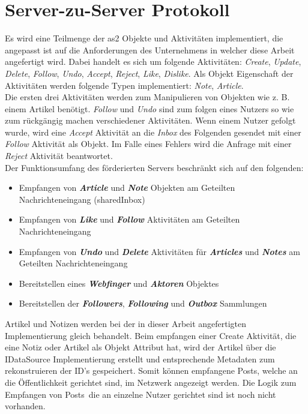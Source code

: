 \section{Server-zu-Server Protokoll}
\label{sec:server-zu-server-prot}
Es wird eine Teilmenge der \gls{as2} Objekte und Aktivitäten implementiert, die angepasst ist auf die Anforderungen des Unternehmens in welcher diese Arbeit angefertigt wird. Dabei handelt es sich um folgende Aktivitäten: \textit{Create}, \textit{Update}, \textit{Delete}, \textit{Follow}, \textit{Undo}, \textit{Accept}, \textit{Reject}, \textit{Like}, \textit{Dislike}. Als Objekt Eigenschaft der Aktivitäten werden folgende Typen implementiert: \textit{Note}, \textit{Article}.\\

Die ersten drei Aktivitäten werden zum Manipulieren von Objekten wie z. B. einem Artikel benötigt. \textit{Follow} und \textit{Undo} sind zum folgen eines Nutzers so wie zum rückgängig machen verschiedener Aktivitäten. Wenn einem Nutzer gefolgt wurde, wird eine \textit{Accept} Aktivität an die \textit{Inbox} des Folgenden gesendet mit einer \textit{Follow} Aktivität als Objekt. Im Falle eines Fehlers wird die Anfrage mit einer \textit{Reject} Aktivität beantwortet.\\

Der Funktionsumfang des förderierten Servers beschränkt sich auf den folgenden:
\begin{itemize}
	\item Empfangen von \textit{\textbf{Article}} und \textit{\textbf{Note}} Objekten am Geteilten Nachrichteneingang (sharedInbox)
	\item Empfangen von \textit{\textbf{Like}} und \textit{\textbf{Follow}} Aktivitäten am Geteilten Nachrichteneingang
	\item Empfangen von \textit{\textbf{Undo}} und \textit{\textbf{Delete}} Aktivitäten für \textit{\textbf{Articles}} und \textit{\textbf{Notes}} am Geteilten Nachrichteneingang 
	\item Bereitstellen eines \textit{\textbf{Webfinger}} und \textit{\textbf{Aktoren}} Objektes
	\item Bereitstellen der \textit{\textbf{Followers}}, \textit{\textbf{Following}} und \textit{\textbf{Outbox}} Sammlungen
\end{itemize}

Artikel und Notizen werden bei der in dieser Arbeit angefertigten Implementierung gleich behandelt. Beim empfangen einer Create Aktivität, die eine Notiz oder Artikel als Objekt Attribut hat, wird der Artikel über die IDataSource Implementierung erstellt und entsprechende Metadaten zum rekonstruieren der ID's gespeichert. Somit können empfangene \glqq Posts\grqq, welche an die Öffentlichkeit gerichtet sind, im Netzwerk angezeigt werden. Die Logik zum Empfangen von \glqq Posts\grqq~die an einzelne Nutzer gerichtet sind ist noch nicht vorhanden.\\

